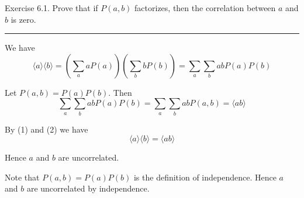\documentclass[12pt]{article}
\begin{document}
Exercise 6.1.
Prove that if $P(a,b)$ factorizes, then the correlation
between $a$ and $b$ is zero.

\bigskip
\hrule

\bigskip
We have
\begin{equation*}
\langle a\rangle\langle b\rangle
=\left(\sum_aaP(a)\right)\left(\sum_bbP(b)\right)
=\sum_a\sum_babP(a)P(b)
\tag{1}
\end{equation*}

Let $P(a,b)=P(a)P(b)$.
Then
\begin{equation*}
\sum_a\sum_babP(a)P(b)=\sum_a\sum_babP(a,b)=\langle ab\rangle
\tag{2}
\end{equation*}

By (1) and (2) we have
\begin{equation*}
\langle a\rangle\langle b\rangle=\langle ab\rangle
\end{equation*}

Hence $a$ and $b$ are uncorrelated.

\bigskip
Note that $P(a,b)=P(a)P(b)$ is the definition of independence.
Hence $a$ and $b$ are uncorrelated by independence.
\end{document}
